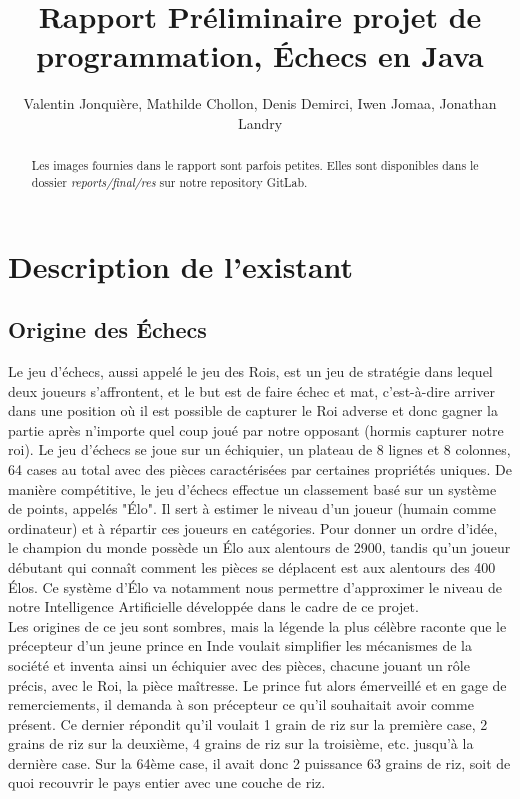 \documentclass{article}
\author{
    Valentin Jonquière,
    Mathilde Chollon,
    Denis Demirci,
    Iwen Jomaa,
    Jonathan Landry
}
\title{Rapport Préliminaire projet de programmation, Échecs en Java}
\begin{document}
\maketitle

\pagebreak

\tableofcontents

\pagebreak
\begin{abstract}
    Les images fournies dans le rapport sont parfois petites.
    Elles sont disponibles dans le dossier \textit{reports/final/res}
    sur notre repository GitLab.
 \end{abstract}


\section{Description de l'existant}
\subsection{Origine des Échecs}
Le jeu d’échecs, aussi appelé le jeu des Rois, est un jeu de stratégie dans lequel deux joueurs s’affrontent,
et le but est de faire échec et mat, c’est-à-dire arriver dans une position où il est possible de capturer
le Roi adverse et donc gagner la partie après n’importe quel coup joué par notre opposant (hormis capturer notre roi).
Le jeu d’échecs se joue sur un échiquier, un plateau de 8 lignes et 8 colonnes, 64 cases au total avec des pièces
caractérisées par certaines propriétés uniques. De manière compétitive, le jeu d'échecs effectue un classement
basé sur un système de points, appelés "Élo". Il sert à estimer le niveau d'un joueur (humain comme ordinateur) et
à répartir ces joueurs en catégories. Pour donner un ordre d'idée, le champion du monde possède un Élo aux alentours de 2900,
tandis qu'un joueur débutant qui connaît comment les pièces se déplacent est aux alentours des 400 Élos. Ce système d'Élo
va notamment nous permettre d'approximer le niveau de notre Intelligence Artificielle développée dans le cadre de ce projet.\\
Les origines de ce jeu sont sombres, mais la légende la plus célèbre raconte que le précepteur d’un jeune prince en Inde
voulait simplifier les mécanismes de la société et inventa ainsi un échiquier avec des pièces, chacune jouant un rôle précis,
avec le Roi, la pièce maîtresse. Le prince fut alors émerveillé et en gage de remerciements, il demanda à son précepteur ce
qu’il souhaitait avoir comme présent. Ce dernier répondit qu’il voulait 1 grain de riz sur la première case, 2 grains de riz
sur la deuxième, 4 grains de riz sur la troisième, etc. jusqu’à la dernière case. Sur la 64ème case, il avait donc
2 puissance 63 grains de riz, soit de quoi recouvrir le pays entier avec une couche de riz.
\end{document}
